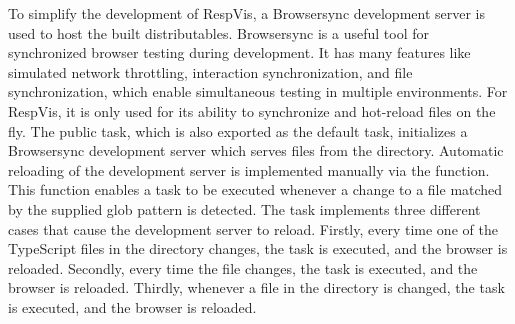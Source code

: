 To simplify the development of RespVis, a Browsersync
\parencite{Browsersync} development server is used to host the built
distributables. Browsersync is a useful tool for synchronized browser
testing during development. It has many features like simulated
network throttling, interaction synchronization, and file
synchronization, which enable simultaneous testing in multiple
environments. For RespVis, it is only used for its ability to
synchronize and hot-reload files on the fly. The public 
task, which is also exported as the default task, initializes a
Browsersync development server which serves files from the 
directory. Automatic reloading of the development server is
implemented manually via the  function. This
function enables a task to be executed whenever a change to a file
matched by the supplied glob pattern is detected. The 
task implements three different cases that cause the development
server to reload. Firstly, every time one of the TypeScript files in
the  directory changes, the  task is
executed, and the browser is reloaded. Secondly, every time the
 file changes, the  task is
executed, and the browser is reloaded. Thirdly, whenever a file in
the  directory is changed, the 
task is executed, and the browser is reloaded.


